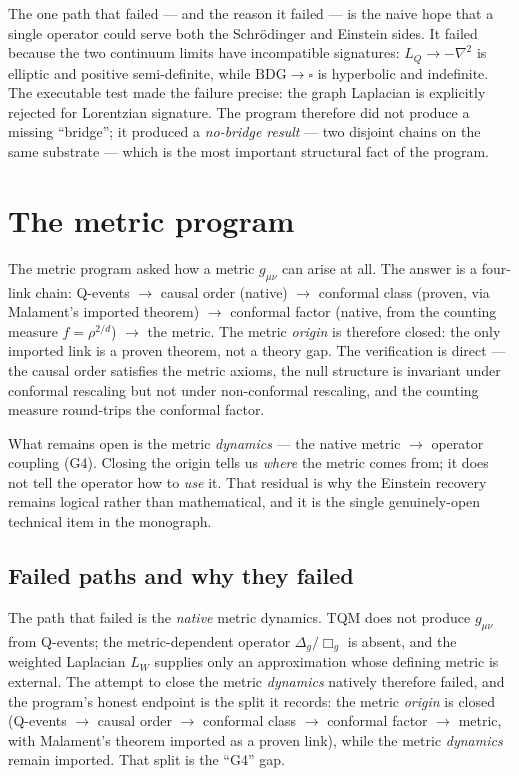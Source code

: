 \documentclass[10pt,twoside,openany]{book}
\begin{document}
The one path that failed --- and the reason it failed --- is the naive hope that a single
operator could serve both the Schr\"odinger and Einstein sides. It failed because the two
continuum limits have incompatible signatures: $L_Q\to-\nabla^2$ is elliptic and positive
semi-definite, while $\mathrm{BDG}\to\square$ is hyperbolic and indefinite. The executable
test made the failure precise: the graph Laplacian is explicitly rejected for Lorentzian
signature. The program therefore did not produce a missing ``bridge''; it produced a
\emph{no-bridge result} --- two disjoint chains on the same substrate --- which is the
most important structural fact of the program.

\section{The metric program}

The metric program asked how a metric $g_{\mu\nu}$ can arise at all. The answer is a
four-link chain: Q-events $\to$ causal order (native) $\to$ conformal class (proven, via
Malament's imported theorem) $\to$ conformal factor (native, from the counting measure
$f=\rho^{2/d}$) $\to$ the metric. The metric \emph{origin} is therefore closed: the only
imported link is a proven theorem, not a theory gap. The verification is direct --- the
causal order satisfies the metric axioms, the null structure is invariant under conformal
rescaling but not under non-conformal rescaling, and the counting measure round-trips the
conformal factor.

What remains open is the metric \emph{dynamics} --- the native metric $\to$ operator
coupling (G4). Closing the origin tells us \emph{where} the metric comes from; it does not
tell the operator how to \emph{use} it. That residual is why the Einstein recovery remains
logical rather than mathematical, and it is the single genuinely-open technical item in
the monograph.

\subsection{Failed paths and why they failed}

The path that failed is the \emph{native} metric dynamics. TQM does not produce
$g_{\mu\nu}$ from Q-events; the metric-dependent operator $\Delta_g/\Box_g$ is absent, and
the weighted Laplacian $L_W$ supplies only an approximation whose defining metric is
external. The attempt to close the metric \emph{dynamics} natively therefore failed, and
the program's honest endpoint is the split it records: the metric \emph{origin} is closed
(Q-events $\to$ causal order $\to$ conformal class $\to$ conformal factor $\to$ metric,
with Malament's theorem imported as a proven link), while the metric \emph{dynamics} remain
imported. That split is the ``G4'' gap.
\end{document}
